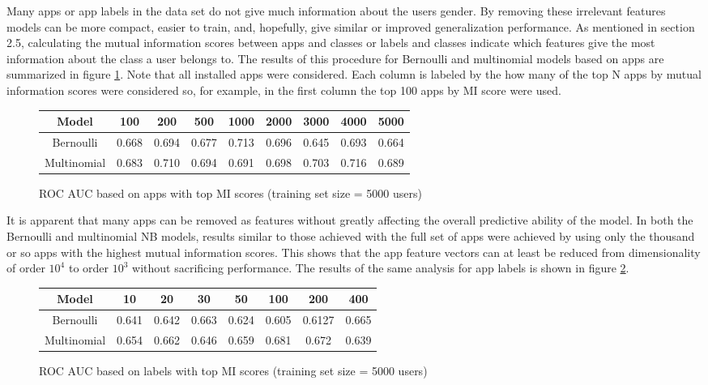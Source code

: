 \documentclass[10pt,twocolumn,letterpaper]{article}
\begin{document}
Many apps or app labels in the data set do not give much information about the users gender.  By removing these irrelevant features models can be more compact, easier to train, and, hopefully, give similar or improved generalization performance.  As mentioned in section 2.5, calculating the mutual information scores between apps and classes or labels and classes indicate which features give the most information about the class a user belongs to.  The results of this procedure for Bernoulli and multinomial models based on apps are summarized in figure \ref{fig:mi_apps}.  Note that all installed apps were considered. Each column is labeled by the how many of the top N apps by mutual information scores were considered so, for example, in the first column the top 100 apps by MI score were used.
\begin{figure}
\tiny
 \begin{tabular}{|c| c c c c c c c c|} 
 \hline
 Model & 100 & 200& 500 & 1000 & 2000 & 3000 & 4000 & 5000 \\ [0.5ex] 
 \hline\hline
 Bernoulli & 0.668 & 0.694 & 0.677 & 0.713 & 0.696 & 0.645 & 0.693 & 0.664\\[1ex] 
 \hline
 Multinomial & 0.683 & 0.710 & 0.694 & 0.691 & 0.698 & 0.703 & 0.716 & 0.689\\[1ex] 
 \hline
 
\end{tabular}
\caption{ROC AUC based on apps with top MI scores (training set size = 5000 users)}
\label{fig:mi_apps}
\end{figure}

It is apparent that many apps can be removed as features without greatly affecting the overall predictive ability of the model.  In both the Bernoulli and multinomial NB models, results similar to those achieved with the full set of apps were achieved by using only the thousand or so apps with the highest mutual information scores.  This shows that the app feature vectors can at least be reduced from dimensionality of order $10^4$ to order $10^3$ without sacrificing performance. The results of the same analysis for app labels is shown in figure \ref{fig:mi_labels}.      
\begin{figure}
\tiny
 \begin{tabular}{|c| c c c c c c c|} 
 \hline
 Model & 10 & 20 & 30 & 50 & 100 & 200 & 400 \\ [0.5ex] 
 \hline\hline
 Bernoulli & 0.641 & 0.642 & 0.663 & 0.624 & 0.605 & 0.6127 &  0.665\\[1ex] 
 \hline
 Multinomial & 0.654 & 0.662 & 0.646 & 0.659 & 0.681 & 0.672 & 0.639 \\[1ex] 
 \hline
 
\end{tabular}
\caption{ROC AUC based on labels with top MI scores (training set size = 5000 users)}
\label{fig:mi_labels}
\end{figure}
\end{document}
